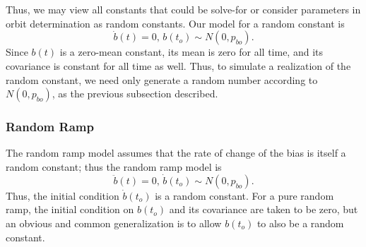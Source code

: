 Thus, we may view all constants that could be solve-for or consider parameters in orbit determination as random constants.  Our model for a random constant is
\begin{equation}
	\dot{b}(t) = 0, \, b(t_o) \sim N(0, p_{bo}).
\end{equation}
Since $b(t)$ is a zero-mean constant, its mean is zero for all time, and its covariance is constant for all time as well.  Thus, to simulate a realization of the random constant, we need only generate a random number according to $N(0, p_{bo})$, as the previous subsection described.

\subsubsection{Random Ramp}

The random ramp model assumes that the rate of change of the bias is itself a random constant; thus the random ramp model is
\begin{equation}
	\ddot{b}(t) = 0, \, \dot{b}(t_o) \sim N(0, p_{\dot{b}o}).
\end{equation}
Thus, the initial condition $\dot{b}(t_o)$ is a random constant.  For a pure random ramp, the initial condition on $b(t_o)$ and its covariance are taken to be zero, but an obvious and common generalization is to allow $b(t_o)$ to also be a random constant.

